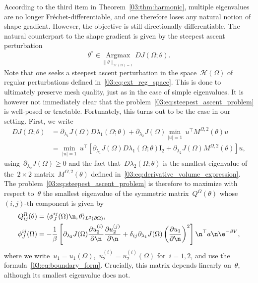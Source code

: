 According to the third item in Theorem~\ref{03:thm:harmonic}, multiple eigenvalues are no longer Fréchet-differentiable, and one therefore loses any natural notion of shape gradient. However, the objective is still directionally differentiable. The natural counterpart to the shape gradient is given by the steepest ascent perturbation
\begin{equation}
    \label{03:eq:steepest_ascent_problem}
    \theta^*\in\underset{\|\theta\|_{\mathcal H(\Omega)=1}}{\mathrm{Argmax}}\,DJ(\Omega;\theta).
\end{equation}
Note that one seeks a steepest ascent perturbation in the space~$\mathcal H(\Omega)$ of regular perturbations defined in~\eqref{03:eq:ext_reg_space}. This is done to ultimately preserve mesh quality, just as in the case of simple eigenvalues. It is however not immediately clear that the problem~\eqref{03:eq:steepest_ascent_problem} is well-posed or tractable. Fortunately, this turns out to be the case in our setting. First, we write
\begin{equation}
    \begin{aligned}
    DJ(\Omega;\theta) &= \partial_{\lambda_1} J(\Omega)D\lambda_1(\Omega;\theta)+\partial_{\lambda_2} J(\Omega)\underset{|u|=1}{\min}\,u^\top M^{\Omega,2}(\theta)u\\
    &= \underset{|u|=1}{\min}\,u^\top\left[\partial_{\lambda_1} J(\Omega)D\lambda_1(\Omega;\theta)\mathrm{I}_{2}+\partial_{\lambda_2} J(\Omega)M^{\Omega,2}(\theta)\right] u,
    \end{aligned}
\end{equation}
using~$\partial_{\lambda_2}J(\Omega)\geq 0$ and the fact that~$D\lambda_2(\Omega;\theta)$ is the smallest eigenvalue of the~$2\times2$ matrix~$M^{\Omega,2}(\theta)$ defined in~\eqref{03:eq:derivative_volume_expression}. The problem~\eqref{03:eq:steepest_ascent_problem} is therefore to maximize with respect to~$\theta$ the smallest eigenvalue of the symmetric matrix~$Q^\Omega(\theta)$ whose~$(i,j)$-th component is given by
\begin{equation}
    \label{03:eq:perturbation_matrix_J_boundary_form}
    \begin{split}
    Q_{ij}^{\Omega}(\theta) &= \langle \phi^{ij}_{J}(\Omega)\n,\theta\rangle_{L^2(\partial\Omega)},\\
    \phi^{ij}_{J}(\Omega) &= -\frac1\beta\left[\partial_{\lambda_2} J(\Omega)\frac{\partial u_2^{(i)}}{\partial\n}\frac{\partial u_2^{(j)}}{\partial\n} +\delta_{ij}\partial_{\lambda_1} J(\Omega)\left(\frac{\partial u_1}{\partial\n}\right)^2\right]\n^\top a\n\e^{-\beta V},
    \end{split}
\end{equation}
where we write~$u_1=u_1(\Omega)$,~$u_2^{{(i)}}=u_2^{(i)}(\Omega)$ for~$i=1,2$, and use the formula~\eqref{03:eq:boundary_form}. Crucially, this matrix depends linearly on~$\theta$, although its smallest eigenvalue does not.


